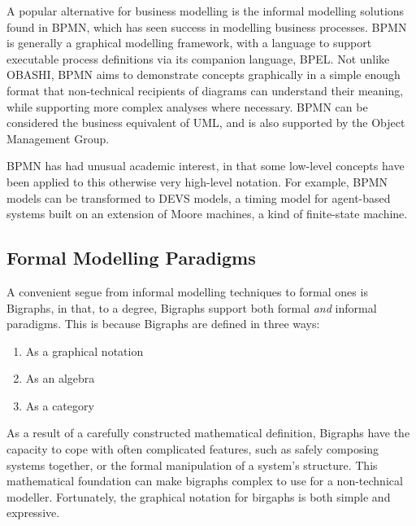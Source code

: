 \documentclass[draft]{report}
\begin{document}
A popular alternative for business modelling is the informal modelling solutions
found in BPMN\cite{bpmn_sources}, which has seen success in modelling business
processes. BPMN is generally a graphical modelling framework, with a language to
support executable process definitions via its companion language,
BPEL\cite{BPEL_SOURCES}. Not unlike OBASHI, BPMN aims to demonstrate concepts
graphically in a simple enough format that non-technical recipients of diagrams
can understand their meaning, while supporting more complex analyses where
necessary. BPMN can be considered the business equivalent of UML, and is also
supported by the Object Management Group\cite{source_for_this_maybe}.\par

BPMN has had unusual academic interest, in that some low-level concepts have
been applied to this otherwise very high-level notation. For example, BPMN
models can be transformed to DEVS models\cite{bazoun2014business}, a timing
model for agent-based systems built on an extension of Moore machines, a kind of
finite-state machine\cite{DEVS}.\par









\subsection{Formal Modelling Paradigms}
\label{subsec:formal_model_lit}

\label{subsubsec:bigraphs}
A convenient segue from informal modelling techniques to formal ones is
Bigraphs, in that, to a degree, Bigraphs support both formal \emph{and} informal
paradigms. This is because Bigraphs are defined in three ways:

\begin{enumerate}
\item As a graphical notation
\item As an algebra
\item As a category
\end{enumerate}

As a result of a carefully constructed mathematical definition, Bigraphs have
the capacity to cope with often complicated features, such as safely composing
systems together, or the formal manipulation of a system's structure. This
mathematical foundation can make bigraphs complex to use for a non-technical
modeller. Fortunately, the graphical notation for birgaphs is both simple and
expressive.\par
\end{document}
